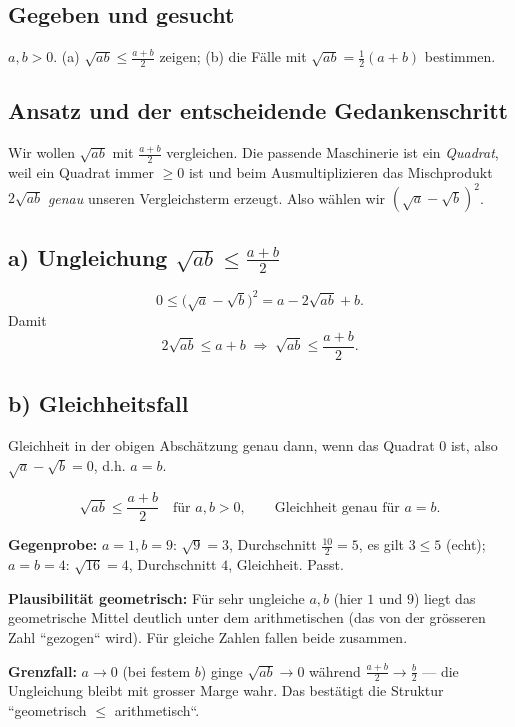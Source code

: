 

\subsection*{Gegeben und gesucht}
$a,b>0$. (a) $\sqrt{ab}\le\tfrac{a+b}2$ zeigen; (b) die Fälle mit
$\sqrt{ab}=\tfrac12(a+b)$ bestimmen.

\subsection*{Ansatz und der entscheidende Gedankenschritt}
Wir wollen $\sqrt{ab}$ mit $\frac{a+b}2$ vergleichen. Die passende
Maschinerie ist ein \emph{Quadrat}, weil ein Quadrat immer
$\ge0$ ist und beim Ausmultiplizieren das Mischprodukt $2\sqrt{ab}$
\emph{genau} unseren Vergleichsterm erzeugt. Also w\"ahlen wir
$(\sqrt a-\sqrt b)^2$.

\subsection*{a) Ungleichung $\sqrt{ab}\le\frac{a+b}2$}
\begin{equation}
  0\le\bigl(\sqrt a-\sqrt b\bigr)^2 = a-2\sqrt{ab}+b .
\end{equation}
Damit
\begin{equation}
  2\sqrt{ab}\le a+b \;\Longrightarrow\;
  \sqrt{ab}\le\frac{a+b}2 . \tag*{$\checkmark$}
\end{equation}

\subsection*{b) Gleichheitsfall}
Gleichheit in der obigen Abschätzung genau dann, wenn das Quadrat $0$
ist, also $\sqrt a-\sqrt b=0$, d.h. $a=b$.

\begin{ergebnis}
\begin{equation*}
  \sqrt{ab}\le\frac{a+b}2 \quad\text{für }a,b>0,\qquad
  \text{Gleichheit genau für } a=b .
\end{equation*}
\end{ergebnis}

\begin{kontrolle}
\textbf{Gegenprobe:} $a=1,b=9$: $\sqrt{9}=3$, Durchschnitt
$\frac{10}2=5$, es gilt $3\le5$ (echt); $a=b=4$: $\sqrt{16}=4$,
Durchschnitt $4$, Gleichheit. Passt.

\textbf{Plausibilität geometrisch:} F\"ur sehr ungleiche $a,b$
(hier $1$ und $9$) liegt das geometrische Mittel deutlich unter dem
arithmetischen (das von der gr\"osseren Zahl ``gezogen`` wird). F\"ur
gleiche Zahlen fallen beide zusammen.

\textbf{Grenzfall:} $a\to0$ (bei festem $b$) ginge $\sqrt{ab}\to0$
w\"ahrend $\frac{a+b}2\to\frac b2$ --- die Ungleichung bleibt mit
grosser Marge wahr. Das bestätigt die Struktur ``geometrisch $\le$
arithmetisch``.
\end{kontrolle}

